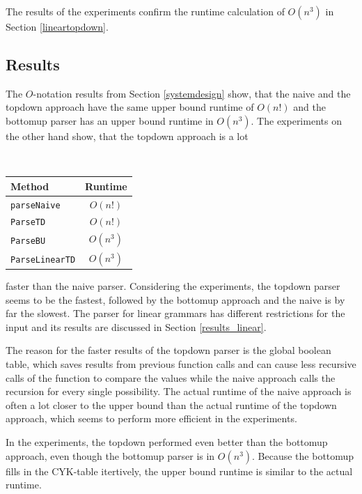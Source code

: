 \documentclass[a4paper, 11pt]{article}
\begin{document}
The results of the experiments confirm the runtime calculation of $O(n^3)$ in Section \ref{lineartopdown}.



\subsection{Results}
\label{results}

\begin{minipage}{0.5\textwidth}
The $O$-notation results from Section \ref{systemdesign} show, that the naive and the topdown approach have the same upper bound runtime of $O(n!)$ and the bottomup parser has an upper bound runtime in $O(n^3)$.
The experiments on the other hand show, that the topdown approach is a lot 
\end{minipage}
\begin{minipage}{0.1\textwidth} \ \end{minipage}
\begin{minipage}{0.3\textwidth}
\begin{tabular}{|l|c|}
\hline
Method & Runtime \\
\hline
\texttt{parseNaive} & $O(n!)$\\
\texttt{ParseTD} & $O(n!)$ \\
\texttt{ParseBU} & $O(n^3)$\\
\texttt{ParseLinearTD} & $O(n^3)$\\
\hline
\end{tabular}
\end{minipage}


faster than the naive parser. Considering the experiments, the topdown parser seems to be the fastest, followed by the bottomup approach and the naive is by far the slowest.
The parser for linear grammars has different restrictions for the input and its results are discussed in Section \ref{results_linear}.

The reason for the faster results of the topdown parser is the global boolean table, which saves results from previous function calls and can cause less recursive calls of the function to compare the values while the naive approach calls the recursion for every single possibility. The actual runtime of the naive approach is often a lot closer to the upper bound than the actual runtime of the topdown approach, which seems to perform more efficient in the experiments.

In the experiments, the topdown performed even better than the bottomup approach, even though the bottomup parser is in $O(n^3)$. Because the bottomup fills in the CYK-table itertively, the upper bound runtime is similar to the actual runtime.
\end{document}
